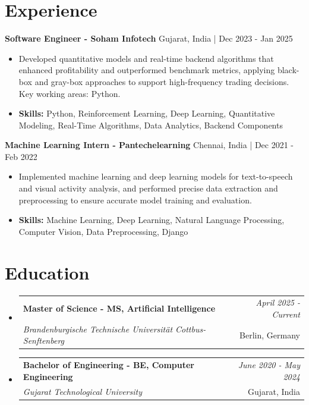\documentclass[a4paper,11pt]{article}
\makeatletter
\newcommand{\resumeSubheading}[4]{
\vspace{0.5mm}\item
    \begin{tabular*}{\linewidth}[t]{l@{\extracolsep{\fill}}r}
        \textbf{#1} & \textit{\footnotesize{#4}} \\
        \textit{\footnotesize{#3}} &  \footnotesize{#2}\\
    \end{tabular*}
    \vspace{-2.4mm}
}
\makeatother
\begin{document}
\section{\textbf{Experience}}


\vspace{1mm}
  \textbf{Software Engineer - Soham Infotech} \hfill Gujarat, India | Dec 2023 - Jan 2025
\vspace{-1.5mm} %
\begin{itemize}
  \item Developed quantitative models and real-time backend algorithms that enhanced profitability and outperformed benchmark metrics, applying black-box and gray-box approaches to support high-frequency trading decisions. Key working areas: Python.

\vspace{-2mm}
  \item \textbf{Skills:} Python, Reinforcement Learning, Deep Learning, Quantitative Modeling, Real-Time Algorithms, Data Analytics, Backend Components
\end{itemize}

\vspace{1mm}
  \textbf{Machine Learning Intern - Pantechelearning} \hfill Chennai, India | Dec 2021 - Feb 2022
\vspace{-1.5mm} %
\begin{itemize}
  \item Implemented machine learning and deep learning models for text-to-speech and visual activity analysis, and performed precise data extraction and preprocessing to ensure accurate model training and evaluation.
\vspace{-2mm}
  \item \textbf{Skills:} Machine Learning, Deep Learning, Natural Language Processing, Computer Vision, Data Preprocessing, Django
\end{itemize}\section{\textbf{Education}}
\vspace{-0.4mm}

\begin{itemize}[leftmargin=0.15in, label={}]
\resumeSubheading
{Master of Science - MS, Artificial Intelligence }{Berlin, Germany}
{Brandenburgische Technische Universität Cottbus-Senftenberg  }{April 2025 - Current}

\vspace{1.0mm} %
\resumeSubheading
{Bachelor of Engineering - BE, Computer Engineering  }{Gujarat, India}
{Gujarat Technological University }{June 2020 - May 2024}

\end{itemize}
\end{document}

